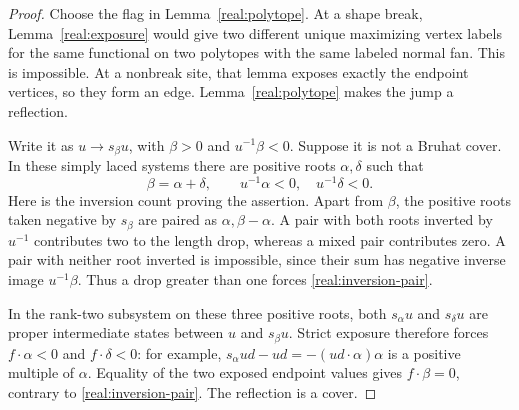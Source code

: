 \begin{proof}
Choose the flag in Lemma~\ref{real:polytope}.  At a shape break,
Lemma~\ref{real:exposure} would give two different unique maximizing
vertex labels for the same functional on two polytopes with the
same labeled normal fan.  This is impossible.  At a nonbreak site,
that lemma exposes exactly the endpoint vertices, so they form an
edge.  Lemma~\ref{real:polytope} makes the jump a reflection.

Write it as $u\to s_\beta u$, with $\beta>0$ and
$u^{-1}\beta<0$.  Suppose it is not a Bruhat cover.  In these simply
laced systems there are positive roots $\alpha,\delta$ such that
\begin{equation}\label{real:inversion-pair}
 \beta=\alpha+\delta,\qquad
 u^{-1}\alpha<0,\quad u^{-1}\delta<0.
\end{equation}
Here is the inversion count proving the assertion.  Apart from
$\beta$, the positive roots taken negative by $s_\beta$ are paired
as $\alpha,\beta-\alpha$.  A pair with both roots inverted by
$u^{-1}$ contributes two to the length drop, whereas a mixed pair
contributes zero.  A pair with neither root inverted is impossible,
since their sum has negative inverse image $u^{-1}\beta$.
Thus a drop greater than one forces \eqref{real:inversion-pair}.

In the rank-two subsystem on these three positive roots, both
$s_\alpha u$ and $s_\delta u$ are proper intermediate states between
$u$ and $s_\beta u$.  Strict exposure therefore forces
$f\cdot\alpha<0$ and $f\cdot\delta<0$: for example,
$s_\alpha ud-ud=-(ud\cdot\alpha)\alpha$ is a positive multiple
of $\alpha$.  Equality of the two exposed endpoint values gives
$f\cdot\beta=0$, contrary to \eqref{real:inversion-pair}.
The reflection is a cover.
\end{proof}

